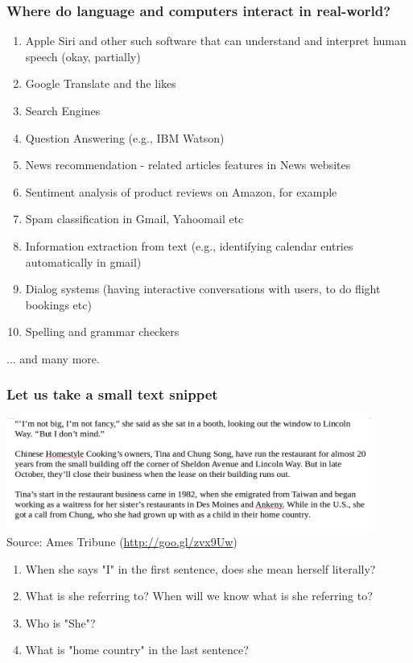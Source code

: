 \documentclass{beamer}
\begin{document}
\begin{frame}
\frametitle{Where do language and computers interact in real-world?}
\begin{enumerate}
\item Apple Siri and other such software that can understand and interpret human speech (okay, partially)
\item Google Translate and the likes
\item Search Engines
\item Question Answering (e.g., IBM Watson)
\item News recommendation - related articles features in News websites
\item Sentiment analysis of product reviews on Amazon, for example
\item Spam classification in Gmail, Yahoomail etc
\item Information extraction from text (e.g., identifying calendar entries automatically in gmail)
\item Dialog systems (having interactive conversations with users, to do flight bookings etc)
\item Spelling and grammar checkers
\end{enumerate}
... and many more. 
\end{frame}

\begin{frame}
\frametitle{Let us take a small text snippet}
\includegraphics[width=0.9\textwidth]{Example.png}
\\ \footnotesize{Source: Ames Tribune (\url{http://goo.gl/zvx9Uw})}

\begin{enumerate}
\item When she says "I" in the first sentence, does she mean herself literally? \pause
\item What is she referring to? When will we know what is she referring to? \pause
\item Who is "She"? \pause
\item What is "home country" in the last sentence?  
\end{enumerate}
\end{frame}
\end{document}
